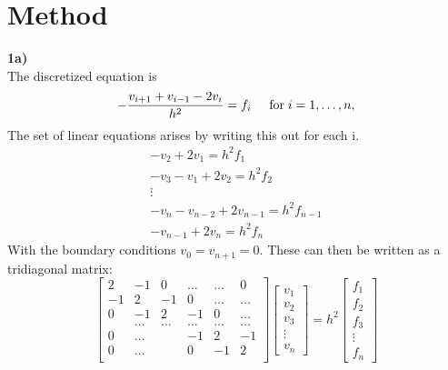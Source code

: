 \documentclass{article}
\begin{document}
\section{Method}
\textbf{1a)}\\
The discretized equation is
\begin{equation}
    -\frac{v_{i+1}+v_{i-1}-2v_i}{h^2} = f_i  \hspace{0.5cm} \mathrm{for} \hspace{0.1cm} i=1,\dots, n,
\end{equation}
The set of linear equations arises by writing this out for each i.
\begin{equation}
    \begin{gathered}
    -v_2 + 2v_1 = h^2f_1 \\
    -v_3 - v_1 + 2v_2 = h^2f_2 \\
            \vdots\\
    -v_n - v_{n-2} + 2v_{n-1} = h^2f_{n-1}\\
     - v_{n-1} + 2v_{n} = h^2f_{n}
    \end{gathered}
\end{equation}
With the boundary conditions $v_0 = v_{n+1} = 0$. These can then be written as a tridiagonal matrix:
\begin{equation}
    \begin{bmatrix}
                           2& -1& 0 &\dots   & \dots &0 \\
                           -1 & 2 & -1 &0 &\dots &\dots \\
                           0&-1 &2 & -1 & 0 & \dots \\
                           & \dots   & \dots &\dots   &\dots & \dots \\
                           0&\dots   &  &-1 &2& -1 \\
                           0&\dots    &  & 0  &-1 & 2 \\
                      \end{bmatrix}
            \begin{bmatrix}
        v_1\\v_2\\v_3\\\vdots\\v_n
    \end{bmatrix}
    = h^2\begin{bmatrix}
        f_1\\f_2\\f_3\\\vdots\\f_n
    \end{bmatrix}
\end{equation}
\end{document}

